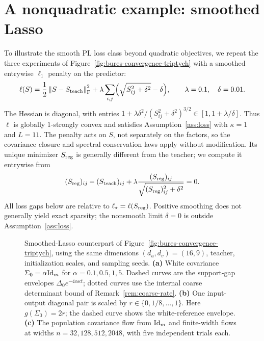 \section{A nonquadratic example: smoothed Lasso}
\label{app:smooth-lasso}

To illustrate the smooth PL loss class beyond quadratic objectives, we repeat the three experiments of
Figure~\ref{fig:bures-convergence-triptych} with a smoothed entrywise $\ell_1$ penalty on the predictor:
\begin{equation}\label{eq:smooth-lasso-loss}
  \ell(S)=\frac12\left\lVert S-S_{\rm teach} \right\rVert_{\mathrm{F}}^2
  +\lambda\sum_{i,j}\Bigl(\sqrt{S_{ij}^2+\delta^2}-\delta\Bigr),
  \qquad \lambda=0.1,\quad \delta=0.01.
\end{equation}
The Hessian is diagonal, with entries
$1+\lambda\delta^2/(S_{ij}^2+\delta^2)^{3/2}\in[1,1+\lambda/\delta]$.
Thus $\ell$ is globally $1$-strongly convex and satisfies Assumption~\ref{ass:loss}
with $\kappa=1$ and $L=11$.
The penalty acts on $S$, not separately on the factors, so the covariance closure and spectral conservation laws apply without modification.
Its unique minimizer $S_{\rm reg}$ is generally different from the teacher; we compute it entrywise from
\[
  (S_{\rm reg})_{ij}-(S_{\rm teach})_{ij}
  +\lambda\frac{(S_{\rm reg})_{ij}}{\sqrt{(S_{\rm reg})_{ij}^2+\delta^2}}=0.
\]
All loss gaps below are relative to $\ell_\star=\ell(S_{\rm reg})$.
Positive smoothing does not generally yield exact sparsity; the nonsmooth limit $\delta=0$ is outside Assumption~\ref{ass:loss}.

\begin{figure}[htbp]
  \centering
  \resizebox{\linewidth}{!}{}
  \captionsetup{font=footnotesize,skip=2pt}
  \caption{Smoothed-Lasso counterpart of Figure~\ref{fig:bures-convergence-triptych}, using the same dimensions $(d_u,d_v)=(16,9)$, teacher,
    initialization scales, and sampling seeds.
    \textbf{(a)} White covariance $\Sigma_0=\alpha\mathrm{Id}_m$ for $\alpha=0.1,0.5,1,5$.
    Dashed curves are the support-gap envelopes $\Delta_0 e^{-4\alpha\kappa t}$; dotted curves use the internal coarse determinant bound of Remark~\ref{rem:coarse-rate}.
    \textbf{(b)} One input-output diagonal pair is scaled by $r\in\{0,1/8,\ldots,1\}$.
    Here $g(\Sigma_0)=2r$; the dashed curve shows the white-reference envelope.
    \textbf{(c)} The population covariance flow from $\mathrm{Id}_m$ and finite-width flows at widths $n=32,128,512,2048$, with five independent trials each.}
  \label{fig:smooth-lasso-triptych}
\end{figure}
